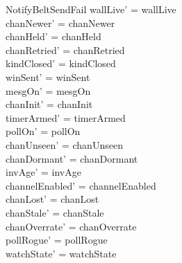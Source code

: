 \documentclass[a4paper,10pt,fleqn]{article}
\begin{document}
\begin{schema}{NotifyBeltSendFail}
  wallLive' = wallLive \\
  chanNewer' = chanNewer \\
  chanHeld' = chanHeld \\
  chanRetried' = chanRetried \\
  kindClosed' = kindClosed \\
  winSent' = winSent \\
  mesgOn' = mesgOn \\
  chanInit' = chanInit \\
  timerArmed' = timerArmed \\
  pollOn' = pollOn \\
  chanUnseen' = chanUnseen \\
  chanDormant' = chanDormant \\
  invAge' = invAge \\
  channelEnabled' = channelEnabled \\
  chanLost' = chanLost \\
  chanStale' = chanStale \\
  chanOverrate' = chanOverrate \\
  pollRogue' = pollRogue \\
  watchState' = watchState
\end{schema}
\end{document}
